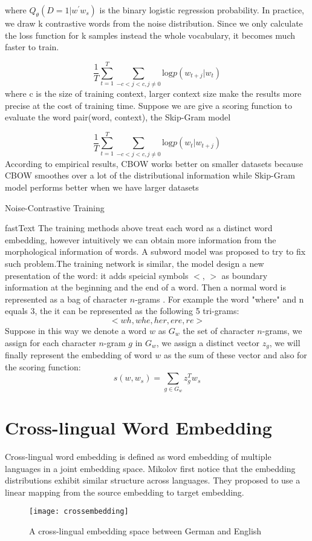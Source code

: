 	where ${Q_{\theta}{(D=1| w^{\prime} w_s)}}$ is the binary logistic regression probability. In practice, we draw k contrastive words from the noise distribution. Since we only calculate the loss function for k samples instead the whole vocabulary, it becomes much faster to train.
	
	
	\[\frac{1}{T} \sum_{t=1}^{T} \sum_{-c<j<c, j\neq 0}{\textrm{log}{p(w_{t+j}|w_t)}}\]
	where c is the size of training context, larger context size make the results more precise at the cost of training time. Suppose we are give a scoring function to evaluate the word pair(word, context), the Skip-Gram model
	
	\[\frac{1}{T} \sum_{t=1}^{T} \sum_{-c<j<c, j\neq 0}{\textrm{log}{p(w_{t}|w_{t+j})}}\]
	 According to  empirical results, CBOW works better on smaller datasets because CBOW smoothes over a lot of the distributional information while Skip-Gram model performs better when we have larger datasets
	
	
	Noise-Contrastive Training
	
	
	fastText
	The training methods above treat each word as a distinct word embedding, however intuitively we can obtain more information from the morphological information of words. A subword model was proposed to try to fix such problem.The training network is similar, the model design a new presentation of the word: it adds speicial symbols $<$, ${>}$ as boundary information at the beginning and the end of a word. Then a normal word is represented as a bag of character $n$-grams . For example the word "where" and n equals 3, the it can be represented as the following 5 tri-grams: 
	\[ <wh, whe, her, ere, re>\]
	Suppose in this way we denote a word ${w}$ as ${G_{w}}$ the set of character ${n}$-grams, we assign for each character ${n}$-gram $g$ in ${G_{w}}$, we assign a distinct vector $z_g$, we will finally represent the embedding of word ${w}$ as the sum of these vector and also for the scoring function:
	\[s(w, w_s) = \sum_{g \in G_{w}} z_g^{T} w_s \]
	
\section{Cross-lingual Word Embedding}
	Cross-lingual word embedding is defined as word embedding of multiple languages in a joint embedding space. Mikolov first notice that the embedding distributions exhibit similar structure across languages. They proposed to use a linear mapping from the source embedding to target embedding. \\
	\begin{figure}[t]
		\texttt{[image: crossembedding]}
		\centering
		\caption{A cross-lingual embedding space between German and English}
	\end{figure}
	
